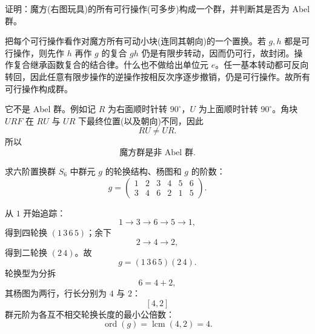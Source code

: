 
\begin{question}[8 分]
证明：魔方(右图玩具)的所有可行操作(可多步)构成一个群，并判断其是否为 Abel 群。
\begin{center}
\end{center}
\begin{solution}
把每个可行操作看作对魔方所有可动小块(连同其朝向)的一个置换。若 $g,h$ 都是可行操作，则先作 $h$ 再作 $g$ 的复合 $gh$ 仍是有限步转动，因而仍可行，故封闭。操作复合继承函数复合的结合律。什么也不做给出单位元 $e$。任一基本转动都可反向转回，因此任意有限步操作的逆操作按相反次序逐步撤销，仍是可行操作。故所有可行操作构成群。

它不是 Abel 群。例如记 $R$ 为右面顺时针转 $90^\circ$，$U$ 为上面顺时针转 $90^\circ$。角块 $URF$ 在 $RU$ 与 $UR$ 下最终位置(以及朝向)不同，因此
\[
RU\neq UR.
\]
所以
\[
\boxed{\text{魔方群是非 Abel 群}}.
\]
\end{solution}
\end{question}

\begin{question}[9 分]
求六阶置换群 $S_6$ 中群元 $g$ 的轮换结构、杨图和 $g$ 的阶数：
\[
g=\begin{pmatrix}
1&2&3&4&5&6\\
3&4&6&2&1&5
\end{pmatrix}.
\]
\begin{solution}
从 $1$ 开始追踪：
\[
1\to3\to6\to5\to1,
\]
得到四轮换 $(1\,3\,6\,5)$；余下
\[
2\to4\to2,
\]
得到二轮换 $(2\,4)$。故
\[
\boxed{g=(1\,3\,6\,5)(2\,4)}.
\]
轮换型为分拆
\[
\boxed{6=4+2},
\]
其杨图为两行，行长分别为 $4$ 与 $2$：
\[
\boxed{[4,2]}
\]
群元阶为各互不相交轮换长度的最小公倍数：
\[
\boxed{\operatorname{ord}(g)=\operatorname{lcm}(4,2)=4}.
\]
\end{solution}
\end{question}

